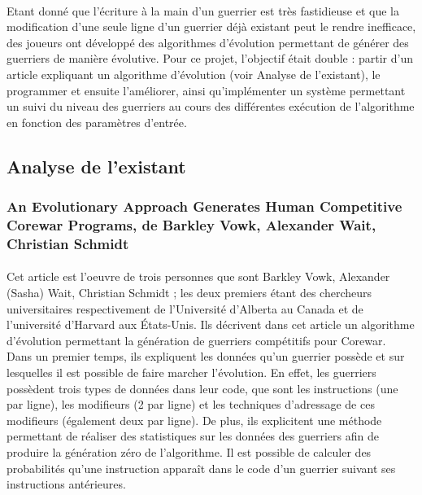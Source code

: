 \documentclass[french]{article}
\begin{document}
        \paragraph{}Etant donné que l'écriture à la main d'un guerrier est très fastidieuse et que la modification d'une seule ligne d'un guerrier déjà existant peut le rendre inefficace, des joueurs ont développé des algorithmes d'évolution permettant de générer  des guerriers de manière évolutive. Pour ce projet, l'objectif était double : partir d'un article expliquant un algorithme d'évolution (voir Analyse de l'existant), le programmer et ensuite l'améliorer, ainsi qu'implémenter un système permettant un suivi du niveau des guerriers au cours des différentes exécution de l'algorithme en fonction des paramètres d'entrée.
        
    \subsection{Analyse de l'existant}
        \subsubsection{An Evolutionary Approach Generates Human Competitive Corewar Programs, de Barkley Vowk, Alexander Wait, Christian Schmidt}
            \paragraph{}Cet article est l'oeuvre de trois personnes que sont Barkley Vowk, Alexander (Sasha) Wait, Christian Schmidt ; les deux premiers étant des chercheurs universitaires respectivement de l'Université d'Alberta au Canada et de l'université d'Harvard aux États-Unis. Ils décrivent dans cet article un algorithme d'évolution permettant la génération de guerriers compétitifs pour Corewar.\\
            
            Dans un premier temps, ils expliquent les données qu'un guerrier possède et sur lesquelles il est possible de faire marcher l'évolution. En effet, les guerriers possèdent trois types de données dans leur code, que sont les instructions (une par ligne), les modifieurs (2 par ligne) et les techniques d'adressage de ces modifieurs (également deux par ligne). De plus, ils explicitent une méthode permettant de réaliser des statistiques sur les données des guerriers afin de produire la génération zéro de l'algorithme. Il est possible de calculer des probabilités qu'une instruction apparaît dans le code d'un guerrier suivant ses instructions antérieures.\\
            
\end{document}
